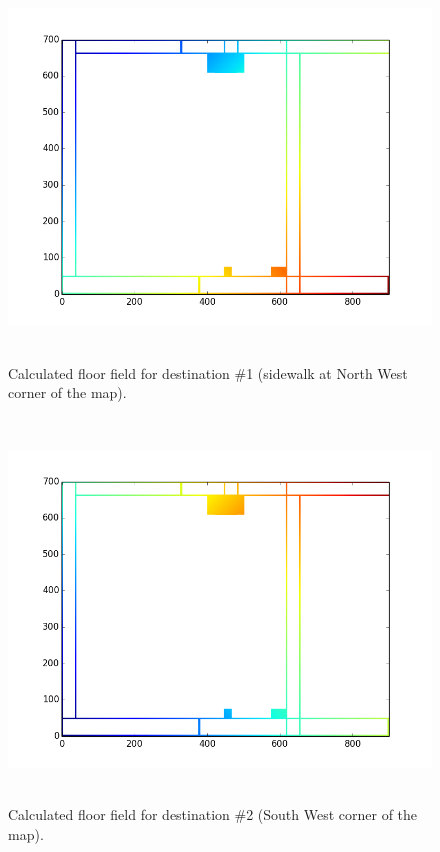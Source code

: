\documentclass[paper=a4, fontsize=11pt]{scrartcl}
\numberwithin{equation}{section}		%
\numberwithin{figure}{section}			%
\numberwithin{table}{section}		    %
\begin{document}
\begin{appendices}
\begin{figure}[H]
	\begin{center}
		\includegraphics[height=4in,width=5.5in]{floor_field_dest1} 
		\caption{Calculated floor field for destination \#1 
			(sidewalk at North West corner of the map).\label{fig:A:ff1}}
	\end{center} 
\end{figure}

\begin{figure}[H]
	\begin{center}
		\includegraphics[height=4in,width=5.5in]{floor_field_dest2} 
		\caption{Calculated floor field for destination \#2 
			(South West corner of the map).\label{fig:A:ff2}}
	\end{center} 
\end{figure}


\end{appendices}
\end{document}
